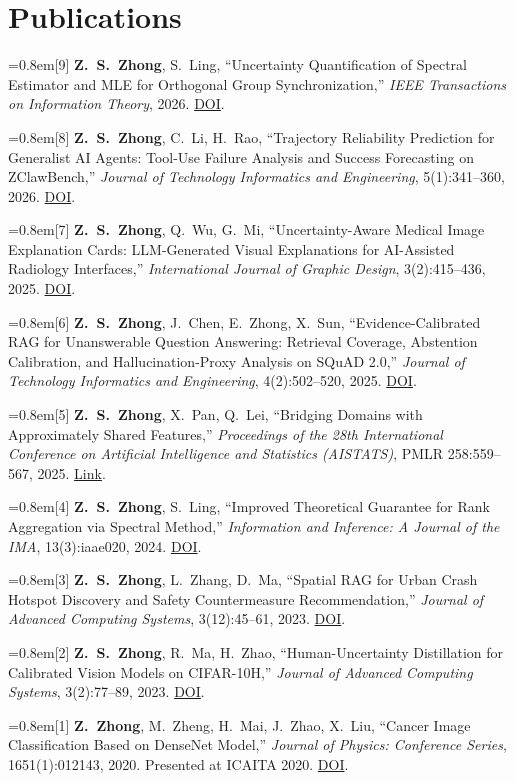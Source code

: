 \documentclass[letterpaper,11pt]{article}
\newcommand{\pub}[1]{\par\vspace{2pt}\hangindent=0.8em\hspace*{0.8em}#1\par}
\begin{document}
\section*{Publications}
\pub{[9] \textbf{Z.\ S.\ Zhong}, S.\ Ling, ``Uncertainty Quantification of Spectral Estimator and MLE for Orthogonal Group Synchronization,'' \textit{IEEE Transactions on Information Theory}, 2026. \href{https://doi.org/10.1109/TIT.2026.3742073}{DOI}.}
\pub{[8] \textbf{Z.\ S.\ Zhong}, C.\ Li, H.\ Rao, ``Trajectory Reliability Prediction for Generalist AI Agents: Tool-Use Failure Analysis and Success Forecasting on ZClawBench,'' \textit{Journal of Technology Informatics and Engineering}, 5(1):341--360, 2026. \href{https://doi.org/10.51903/jtie.v5i1.539}{DOI}.}
\pub{[7] \textbf{Z.\ S.\ Zhong}, Q.\ Wu, G.\ Mi, ``Uncertainty-Aware Medical Image Explanation Cards: LLM-Generated Visual Explanations for AI-Assisted Radiology Interfaces,'' \textit{International Journal of Graphic Design}, 3(2):415--436, 2025. \href{https://doi.org/10.51903/ijgd.v3i2.3616}{DOI}.}
\pub{[6] \textbf{Z.\ S.\ Zhong}, J.\ Chen, E.\ Zhong, X.\ Sun, ``Evidence-Calibrated RAG for Unanswerable Question Answering: Retrieval Coverage, Abstention Calibration, and Hallucination-Proxy Analysis on SQuAD 2.0,'' \textit{Journal of Technology Informatics and Engineering}, 4(2):502--520, 2025. \href{https://doi.org/10.51903/jtie.v4i2.536}{DOI}.}
\pub{[5] \textbf{Z.\ S.\ Zhong}, X.\ Pan, Q.\ Lei, ``Bridging Domains with Approximately Shared Features,'' \textit{Proceedings of the 28th International Conference on Artificial Intelligence and Statistics (AISTATS)}, PMLR 258:559--567, 2025. \href{https://proceedings.mlr.press/v258/zhong25a.html}{Link}.}
\pub{[4] \textbf{Z.\ S.\ Zhong}, S.\ Ling, ``Improved Theoretical Guarantee for Rank Aggregation via Spectral Method,'' \textit{Information and Inference: A Journal of the IMA}, 13(3):iaae020, 2024. \href{https://doi.org/10.1093/imaiai/iaae020}{DOI}.}
\pub{[3] \textbf{Z.\ S.\ Zhong}, L.\ Zhang, D.\ Ma, ``Spatial RAG for Urban Crash Hotspot Discovery and Safety Countermeasure Recommendation,'' \textit{Journal of Advanced Computing Systems}, 3(12):45--61, 2023. \href{https://doi.org/10.69987/jacs.2023.31206}{DOI}.}
\pub{[2] \textbf{Z.\ S.\ Zhong}, R.\ Ma, H.\ Zhao, ``Human-Uncertainty Distillation for Calibrated Vision Models on CIFAR-10H,'' \textit{Journal of Advanced Computing Systems}, 3(2):77--89, 2023. \href{https://doi.org/10.69987/jacs.2023.30206}{DOI}.}
\pub{[1] \textbf{Z.\ Zhong}, M.\ Zheng, H.\ Mai, J.\ Zhao, X.\ Liu, ``Cancer Image Classification Based on DenseNet Model,'' \textit{Journal of Physics: Conference Series}, 1651(1):012143, 2020. Presented at ICAITA 2020. \href{https://doi.org/10.1088/1742-6596/1651/1/012143}{DOI}.}
\end{document}
